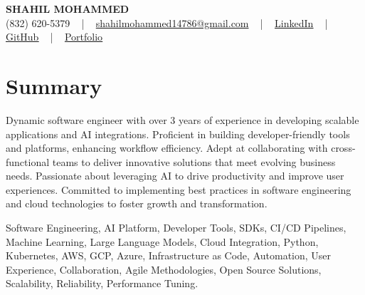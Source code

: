 \documentclass[letterpaper,10pt]{article}
\begin{document}
\begin{center}
    {\fontsize{14pt}{12pt}\selectfont \textbf{\MakeUppercase{Shahil Mohammed}}}\\ \vspace{2pt}
    \fontsize{10pt}{12pt}\selectfont (832) 620-5379 ~ | ~ \href{mailto:shahilmohammed14786@gmail.com}{shahilmohammed14786@gmail.com} ~ | ~  
    \href{https://www.linkedin.com/in/shahil-mohammed-9652931a1/}{\color{blue}\underline{LinkedIn}}  ~ | ~ 
    \href{https://github.com/freakbeast14}{\color{blue}\underline{GitHub}} ~ | ~ 
    \href{https://shahil-mohammed.netlify.app/}{\color{blue}\underline{Portfolio}}
    \vspace{-8pt}
\end{center}

\section{Summary}
\vspace{-2pt}\fontsize{8pt}{9pt}\selectfont
Dynamic software engineer with over 3 years of experience in developing scalable applications and AI integrations. Proficient in building developer-friendly tools and platforms, enhancing workflow efficiency. Adept at collaborating with cross-functional teams to deliver innovative solutions that meet evolving business needs. Passionate about leveraging AI to drive productivity and improve user experiences. Committed to implementing best practices in software engineering and cloud technologies to foster growth and transformation.
 \vspace{-5pt}
 
{\fontsize{1pt}{1pt}\selectfont\color{white}
Software Engineering, AI Platform, Developer Tools, SDKs, CI/CD Pipelines, Machine Learning, Large Language Models, Cloud Integration, Python, Kubernetes, AWS, GCP, Azure, Infrastructure as Code, Automation, User Experience, Collaboration, Agile Methodologies, Open Source Solutions, Scalability, Reliability, Performance Tuning.
}
\vspace{-8pt}

\vspace{-2pt}
\end{document}
